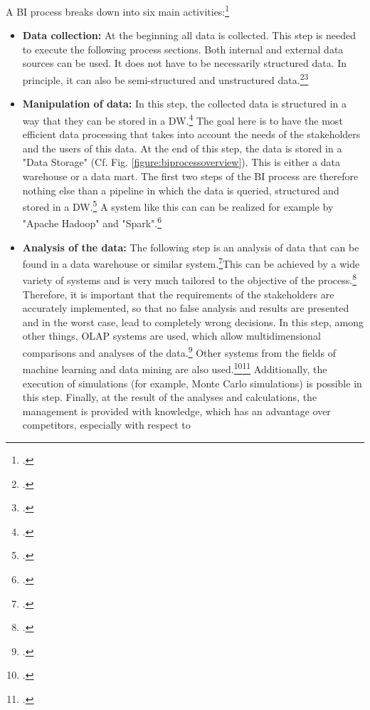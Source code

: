 A \ac{BI} process breaks down into six main activities:\footcite[Cf.][Fig. 2]{foley2010business}
\begin{itemize}
    \item \textbf{Data collection: }At the beginning all data is collected. This step is needed to execute the following
    process sections. Both internal and external data sources can be used. It does not have to be
    necessarily structured data. In principle, it can also be semi-structured and unstructured data.\footcite[Cf.][p. 465]{ranjan2008business}\footcite[Cf.][p. 3]{hartmann2016capturing}
    \item \textbf{Manipulation of data: }In this step, the collected data is structured in a way that
    they can be stored in a \ac{DW}.\footcite[Cf.][p. 463]{ranjan2008business} The goal here is to have the most
    efficient data processing that takes into account the needs of the stakeholders and the users of this data.
    At the end of this step, the data is stored in a "Data Storage" (Cf. Fig. \ref{figure:biprocessoverview}).
    This is either a data warehouse or a data mart. The first two steps of the \ac{BI} process are therefore nothing else than a
    pipeline in which the data is queried, structured and stored in a \ac{DW}.\footcite[Cf.][p. 466]{ranjan2008business}
    A system like this can can be realized for example by "Apache Hadoop" and
    "Spark".\footcite[Cf.][p. 65]{rahman2015big}
    \item \textbf{Analysis of the data: }The following step is an analysis of data that can be found in a data warehouse or similar
    system.\footcite[Cf.][p. 16]{kasemsap2016fundamentals}This can be achieved by a wide variety of systems
    and is very much tailored to the objective of the process.\footcite[Cf.][p. 21]{niu2009cognition} Therefore, it is important
    that the requirements of the stakeholders are accurately implemented, so that no false analysis and results are presented and in the worst case,
    lead to completely wrong decisions. In this step, among other things, \ac{OLAP}
    systems are used, which allow multidimensional comparisons and analyses of the data.\footcite[Cf.][pp. 107]{hovcevar2010assessing}
    Other systems from the fields of machine learning and data mining are also used.\footcite[Cf.][p. 11]{foley2010business}\footcite[Cf.][p. 80]{yeoh2008managing}
    Additionally, the
    execution of simulations (for example, Monte Carlo simulations) is possible in this step. Finally, at
    the result of the analyses and calculations, the management is provided with knowledge, which has an advantage over competitors, especially with respect to

\end{itemize}
